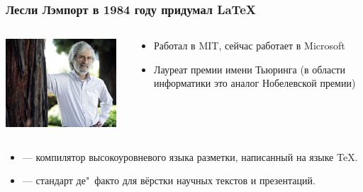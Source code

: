 \documentclass[10pt,pdf,hyperref={unicode}]{beamer}
\begin{document}
\begin{frame}
    \frametitle{Лесли Лэмпорт в 1984 году придумал \LaTeX}
    \begin{columns}[c]
        \begin{column}[c]{0.5\textwidth}
            \includegraphics[keepaspectratio,width=0.95\textwidth]{lamport.jpg}
        \end{column}
        \begin{column}[c]{0.5\textwidth}
            \begin{itemize}
                \item Работал в MIT, сейчас работает в Microsoft
                \item Лауреат премии имени Тьюринга (в области информатики это аналог Нобелевской премии) 
            \end{itemize}
        \end{column}
    \end{columns}
    \vfill
   \begin{itemize}
       \item[\LaTeX{}] --- компилятор высокоуровневого  языка разметки, написанный на  языке \TeX{}.
       \item[\LaTeX{}] --- стандарт де"~факто для вёрстки научных текстов и презентаций.
    \end{itemize}    
\end{frame}
\end{document}

